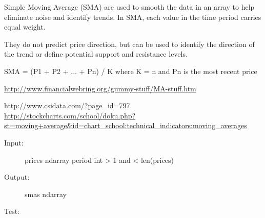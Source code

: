 \documentclass[letterpaper,10pt,english]{sphinxmanual}
\begin{document}
\begin{fulllineitems}
\label{reference:technical_indicators.technical_indicators.sma}
Simple Moving Average (SMA) are used to smooth the data in an array to help
eliminate noise and identify trends.
In SMA, each value in the time period carries equal weight.

They do not predict price direction, but can be used to identify the
direction of the trend or define potential support and resistance levels.

SMA = (P1 + P2 + ... + Pn) / K
where K = n and Pn is the most recent price

\href{http://www.financialwebring.org/gummy-stuff/MA-stuff.htm}{http://www.financialwebring.org/gummy-stuff/MA-stuff.htm}

\href{http://www.csidata.com/?page\_id=797}{http://www.csidata.com/?page\_id=797}
\href{http://stockcharts.com/school/doku.php?st=moving+average\&id=chart\_school:technical\_indicators:moving\_averages}{http://stockcharts.com/school/doku.php?st=moving+average\&id=chart\_school:technical\_indicators:moving\_averages}
\begin{description}
\item[{Input:}] \leavevmode
prices ndarray
period int \textgreater{} 1 and \textless{} len(prices)

\item[{Output:}] \leavevmode
smas ndarray

\end{description}

Test:


\end{fulllineitems}
\end{document}
